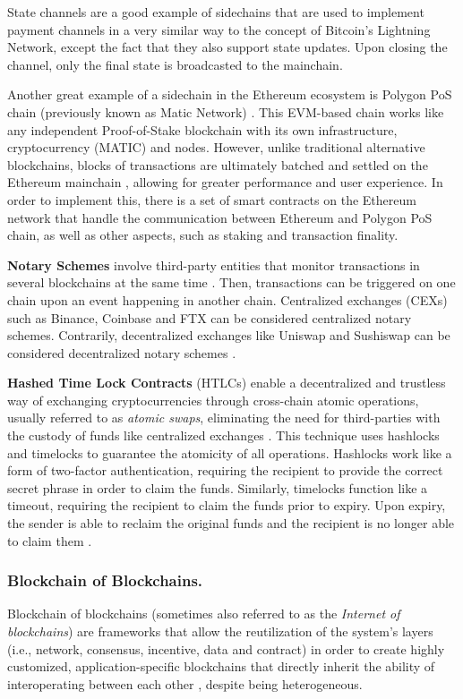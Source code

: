 \documentclass[runningheads]{llncs}
\begin{document}
State channels \cite{eth_statechannels} are a good example of sidechains that are used to implement payment channels in a very similar way to the concept of Bitcoin’s Lightning Network, except the fact that they also support state updates. Upon closing the channel, only the final state is broadcasted to the mainchain.

Another great example of a sidechain in the Ethereum ecosystem is Polygon PoS chain (previously known as Matic Network) \cite{matic}. This EVM-based chain works like any independent Proof-of-Stake blockchain with its own infrastructure, cryptocurrency (MATIC) and nodes. However, unlike traditional alternative blockchains, blocks of transactions are ultimately batched and settled on the Ethereum mainchain \cite{matic}, allowing for greater performance and user experience. In order to implement this, there is a set of smart contracts on the Ethereum network that handle the communication between Ethereum and Polygon PoS chain, as well as other aspects, such as staking and transaction finality.

\textbf{Notary Schemes} involve third-party entities that monitor transactions in several blockchains at the same time \cite{abrunhosa_2021}. Then, transactions can be triggered on one chain upon an event happening in another chain. Centralized exchanges (CEXs) such as Binance, Coinbase and FTX can be considered centralized notary schemes. Contrarily, decentralized exchanges like Uniswap and Sushiswap can be considered decentralized notary schemes \cite{survey}.

\textbf{Hashed Time Lock Contracts} (HTLCs) enable a decentralized and trustless way of exchanging cryptocurrencies through cross-chain atomic operations, usually referred to as \textit{atomic swaps}, eliminating the need for third-parties with the custody of funds like centralized exchanges \cite{survey}. This technique uses hashlocks and timelocks to guarantee the atomicity of all operations. Hashlocks work like a form of two-factor authentication, requiring the recipient to provide the correct secret phrase in order to claim the funds. Similarly, timelocks function like a timeout, requiring the recipient to claim the funds prior to expiry. Upon expiry, the sender is able to reclaim the original funds and the recipient is no longer able to claim them \cite{min_2019}.

\subsubsection{Blockchain of Blockchains.} Blockchain of blockchains (sometimes also referred to as the \textit{Internet of blockchains}) are frameworks that allow the reutilization of the system's layers (i.e., network, consensus, incentive, data and contract) in order to create highly customized, application-specific blockchains that directly inherit the ability of interoperating between each other \cite{survey}, despite being heterogeneous.
\end{document}
